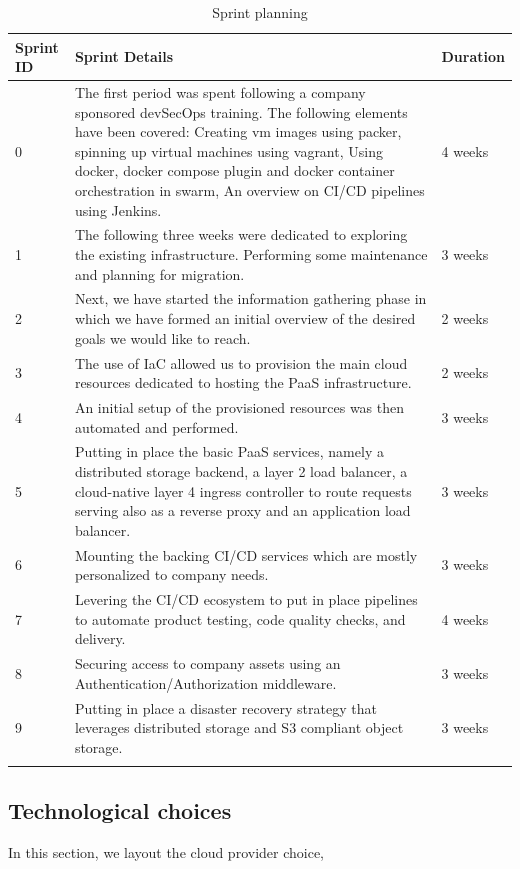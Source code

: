 \begin{longtable}[H]{|m{2cm}|m{10cm}|m{2cm}|}
\hline
 {\textbf{Sprint ID}} & {\textbf{Sprint Details }} & {\textbf{Duration }} \\ \hline 
0 
&
The first period was spent following a company sponsored devSecOps training. The following elements have been covered: 
Creating vm images using packer, spinning up virtual machines using vagrant,  
Using docker, docker compose plugin and docker container orchestration in swarm, 
An overview on CI/CD pipelines using Jenkins. 
&
4 weeks  \\
\hline
1 
&
The following three weeks were dedicated to exploring the existing infrastructure. Performing some maintenance and planning for migration. 
&
3 weeks  \\ \hline
2 
&
Next, we have started the information gathering phase in which we have formed an initial overview of the desired goals we would like to reach. 
&
2 weeks \\ \hline
3 
&
The use of IaC allowed us to provision the main cloud resources dedicated to hosting the PaaS infrastructure. 
&
2 weeks \\ \hline
4 
&
An initial setup of the provisioned resources was then automated and performed. 
&
3 weeks \\ \hline
5 
&
Putting in place the basic PaaS services, namely a distributed storage backend, a layer 2 load balancer, a cloud-native layer 4 ingress controller to route requests serving also as a reverse proxy and an application load balancer. 
&
3 weeks \\ \hline
6 
&
Mounting the backing CI/CD services which are mostly personalized to company needs. 
&
3 weeks \\ \hline
7 
&
Levering the CI/CD ecosystem to put in place pipelines to automate product testing, code quality checks, and delivery. 
&
4 weeks \\ \hline
8 
&
Securing access to company assets using an Authentication/Authorization middleware. 
&
3 weeks \\ \hline
9 
&
Putting in place a disaster recovery strategy that leverages distributed storage and S3 compliant object storage. 
&
3 weeks \\ \hline

\caption{ Sprint planning}
\end{longtable}

\subsection{Technological choices }
In this section, we layout the cloud provider choice,

